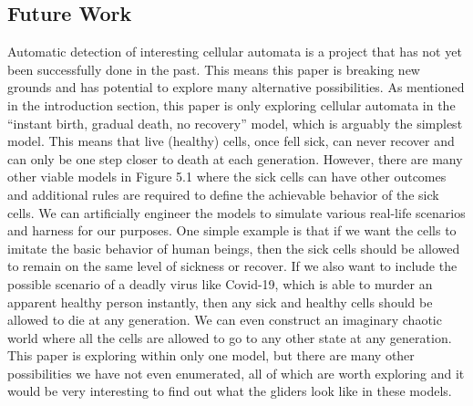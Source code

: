 \documentclass[12pt]{article}
\numberwithin{figure}{section} %
\begin{document}
\subsection{Future Work}
Automatic detection of interesting cellular automata is a project that has not yet been successfully done in the past. This means this paper is breaking new grounds and has potential to explore many alternative possibilities. As mentioned in the introduction section, this paper is only exploring cellular automata in the “instant birth, gradual death, no recovery” model, which is arguably the simplest model. This means that live (healthy) cells, once fell sick, can never recover and can only be one step closer to death at each generation. However, there are many other viable models in Figure 5.1 where the sick cells can have other outcomes and additional rules are required to define the achievable behavior of the sick cells. We can artificially engineer the models to simulate various real-life scenarios and harness for our purposes. One simple example is that if we want the cells to imitate the basic behavior of human beings, then the sick cells should be allowed to remain on the same level of sickness or recover. If we also want to include the possible scenario of a deadly virus like Covid-19, which is able to murder an apparent healthy person instantly, then any sick and healthy cells should be allowed to die at any generation. We can even construct an imaginary chaotic world where all the cells are allowed to go to any other state at any generation. This paper is exploring within only one model, but there are many other possibilities we have not even enumerated, all of which are worth exploring and it would be very interesting to find out what the gliders look like in these models. 
\end{document}
